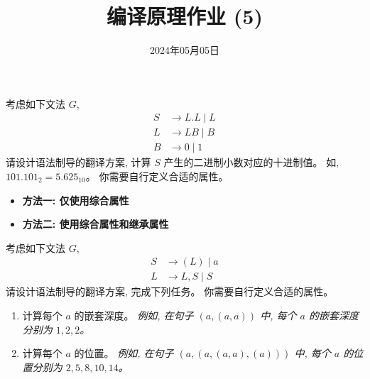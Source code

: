 \documentclass[a4paper, justified]{tufte-handout}
\title{编译原理作业 (5)}
\date{2024年05月05日}
\begin{document}
\maketitle
\noplagiarism %
\begin{abstract}
\end{abstract}
\beginrequired

\begin{problem}
  考虑如下文法 $G$,
  \begin{align*}
    S &\to L.L \mid L \\
    L &\to LB \mid B \\
    B &\to 0 \mid 1
  \end{align*}
  请设计语法制导的翻译方案, 计算 $S$ 产生的二进制小数对应的十进制值。
  如, $101.101_{2} = 5.625_{10}$。
  你需要自行定义合适的属性。
\end{problem}

\clearpage
\begin{solution}
  \begin{itemize}
    \item {\bf 方法一: 仅使用综合属性}
    \item {\bf 方法二: 使用综合属性和继承属性}
  \end{itemize}
\end{solution}

\clearpage
\begin{problem}
  考虑如下文法 $G$,
  \begin{align*}
    S &\to (L) \mid a \\
    L &\to L, S \mid S
  \end{align*}
  请设计语法制导的翻译方案, 完成下列任务。
  你需要自行定义合适的属性。
  \begin{enumerate}[(1)]
    \item 计算每个 $a$ 的嵌套深度。
      {\it 例如, 在句子 $(a, (a, a))$ 中, 每个 $a$ 的嵌套深度分别为 $1, 2, 2$。}
    \item 计算每个 $a$ 的位置。
      {\it 例如, 在句子 $(a, (a, (a, a), (a)))$ 中, 每个 $a$ 的位置分别为
        $2, 5, 8, 10, 14$。}
  \end{enumerate}
\end{problem}
\end{document}
